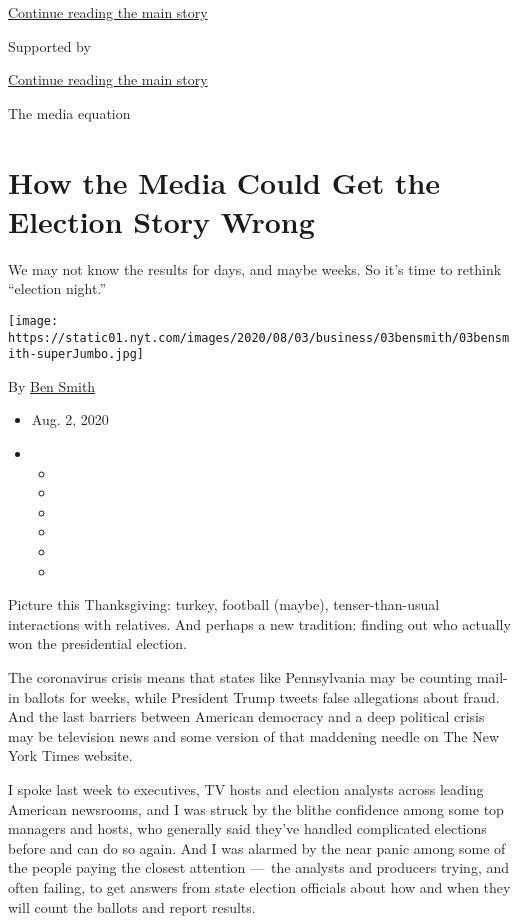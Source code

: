 \protect\hyperlink{after-top}{Continue reading the main story}

Supported by

\protect\hyperlink{after-sponsor}{Continue reading the main story}

The media equation

\hypertarget{how-the-media-could-get-the-election-story-wrong}{%
\section{How the Media Could Get the Election Story
Wrong}\label{how-the-media-could-get-the-election-story-wrong}}

We may not know the results for days, and maybe weeks. So it's time to
rethink ``election night.''

\texttt{[image: https://static01.nyt.com/images/2020/08/03/business/03bensmith/03bensmith-superJumbo.jpg]}

By \href{https://www.nytimes.com/by/ben-smith}{Ben Smith}

\begin{itemize}
\item
  Aug. 2, 2020
\item
  \begin{itemize}
  \item
  \item
  \item
  \item
  \item
  \item
  \end{itemize}
\end{itemize}

Picture this Thanksgiving: turkey, football (maybe), tenser-than-usual
interactions with relatives. And perhaps a new tradition: finding out
who actually won the presidential election.

The coronavirus crisis means that states like Pennsylvania may be
counting mail-in ballots for weeks, while President Trump tweets false
allegations about fraud. And the last barriers between American
democracy and a deep political crisis may be television news and some
version of that maddening needle on The New York Times website.

I spoke last week to executives, TV hosts and election analysts across
leading American newsrooms, and I was struck by the blithe confidence
among some top managers and hosts, who generally said they've handled
complicated elections before and can do so again. And I was alarmed by
the near panic among some of the people paying the closest attention
---~the analysts and producers trying, and often failing, to get answers
from state election officials about how and when they will count the
ballots and report results.

